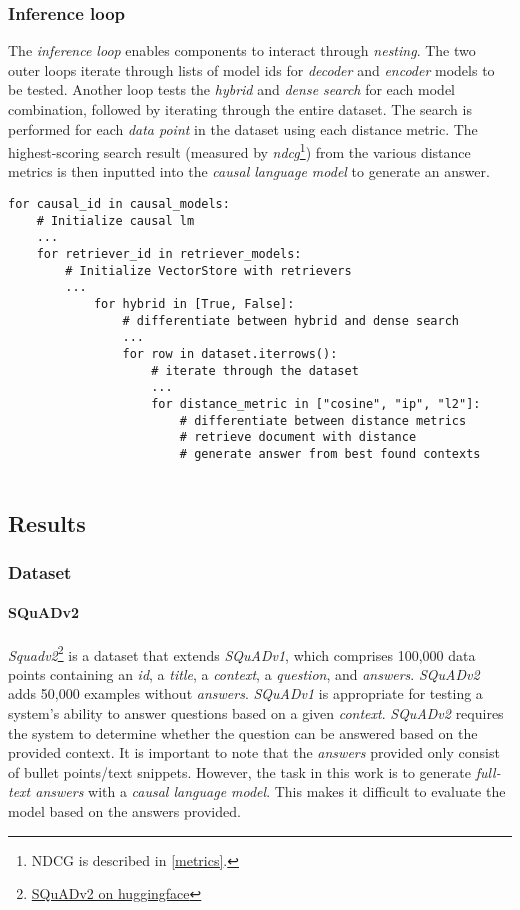 \documentclass{article}
\begin{document}
\subsubsection{Inference loop}
The \textit{inference loop} enables components to interact through \textit{nesting}. The two outer loops iterate through lists of model ids for \textit{decoder} and \textit{encoder} models to be tested.
Another loop tests the \textit{hybrid} and \textit{dense search} for each model combination, followed by iterating through the entire dataset. The search is performed for each \textit{data point} in the dataset using each distance metric. The highest-scoring search result (measured by \textit{ndcg}\footnote{NDCG is described in \cref{metrics}.}) from the various distance metrics is then inputted into the \textit{causal language model} to generate an answer.
\begin{lstlisting}[backgroundcolor = \color{lightgray!25}]
for causal_id in causal_models:
    # Initialize causal lm
    ...
    for retriever_id in retriever_models:
        # Initialize VectorStore with retrievers
        ...
            for hybrid in [True, False]:
                # differentiate between hybrid and dense search
                ...
                for row in dataset.iterrows():
                    # iterate through the dataset
                    ...
                    for distance_metric in ["cosine", "ip", "l2"]:
                        # differentiate between distance metrics
                        # retrieve document with distance
                        # generate answer from best found contexts
                    
\end{lstlisting}
\subsection{Results}
\subsubsection{Dataset}
\paragraph{SQuADv2}
\textit{Squadv2}\footnote{\href{https://huggingface.co/datasets/squad_v2}{SQuADv2 on huggingface}} is a dataset that extends \textit{SQuADv1}, which comprises 100,000 data points containing an \textit{id}, a \textit{title}, a \textit{context}, a \textit{question}, and \textit{answers}.   \textit{SQuADv2} adds 50,000 examples without \textit{answers}.
\textit{SQuADv1} is appropriate for testing a system's ability to answer questions based on a given \textit{context}. \textit{SQuADv2} requires the system to determine whether the question can be answered based on the provided context.
It is important to note that the \textit{answers} provided only consist of bullet points/text snippets. However, the task in this work is to generate \textit{full-text answers} with a \textit{causal language model}. This makes it difficult to evaluate the model based on the answers provided.
\end{document}
